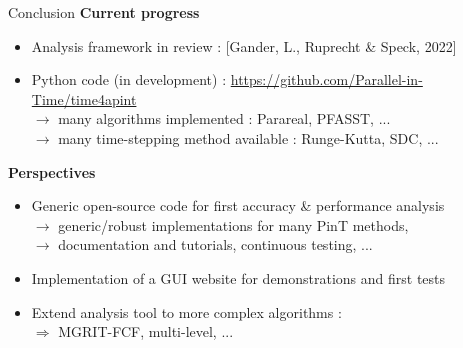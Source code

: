 \documentclass[11pt,aspectratio=43]{beamer}
\begin{document}
\begin{frame}{Conclusion}\vskip10pt
	\textbf{Current progress}
	\begin{itemize}
		\item Analysis framework in review : [Gander, L., Ruprecht \& Speck, 2022]
		\item Python code (in development) : \url{https://github.com/Parallel-in-Time/time4apint}\\
		$\rightarrow$ many algorithms implemented : Parareal, PFASST, ...\\
		$\rightarrow$ many time-stepping method available : Runge-Kutta, SDC, ...
	\end{itemize}\vskip10pt
	\textbf{Perspectives}
	\begin{itemize}
		\item Generic open-source code for first accuracy \& performance analysis \\
		 $\rightarrow$ generic/robust implementations for many PinT methods,\\
		 $\rightarrow$ documentation and tutorials, continuous testing, ...
		\item Implementation of a GUI website for demonstrations and first tests
		\item Extend analysis tool to more complex algorithms :\\
		$\Rightarrow$ MGRIT-FCF, multi-level, ...
	\end{itemize}
\end{frame}
\end{document}
